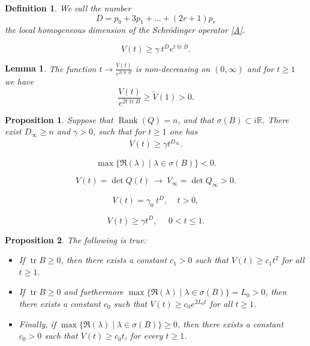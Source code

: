 \documentclass[10pt,a4paper]{amsart}
\newtheorem{definition}{Definition}
\newtheorem{lemma}{Lemma}
\newtheorem{proposition}{Proposition}
\newcommand{\tr}{\operatorname{tr}}
\begin{document}
\begin{definition}\label{D:hd}
We call the number  
\begin{equation}\label{hd}
D = p_0+3p_1+\ldots+(2r+1)p_r
\end{equation}
the \emph{local homogeneous dimension} of the Schr\"odinger operator \eqref{A}. 
\end{definition}

\begin{equation}\label{H0}
V(t) \ge \gamma\ t^{D} e^{t \tr B}.
\end{equation}

\begin{lemma}\label{L:ber}
The function $t\to \frac{V(t)}{e^{2 t \tr B}}$ is non-decreasing on $(0,\infty)$ and for $t\ge 1$ we have  
\begin{equation}\label{below}
\frac{V(t)}{e^{2 t \tr B}} \ge \tilde V(1)>0.
\end{equation}
\end{lemma}

\begin{proposition}\label{P:ii}
Suppose that $\operatorname{Rank}(Q) = n$, and that $\sigma(B)\subset i \mathbb{R}$. There exist $D_{\infty}\ge n$ and $\gamma>0$, such that for $t\ge 1$ one has
\begin{align*}
V(t)\ge \gamma t^{D_{\infty}}.
\end{align*}
\end{proposition}

\begin{equation}\label{quasi}
\max\{\Re(\lambda)\mid \lambda\in \sigma(B)\}< 0.
\end{equation}

\begin{equation}\label{quasinfty}
V(t) = \det Q(t) \ \longrightarrow\ V_\infty = \det Q_\infty > 0.
\end{equation}

\begin{equation}\label{voldil}
\overline V(t) = \gamma_0\ t^{D},\ \ \ \ \ t>0,
\end{equation}

\begin{equation}\label{vicinoa0}
V(t) \ge \gamma t^D,\ \ \ \ \ \ 0<t\le 1.
\end{equation}

\begin{proposition}\label{P:boom0}
The following is true:
\begin{itemize}
\item[(i)] If $\tr B \ge 0$, then there exists a constant $c_1>0$ such that $V(t) \geq c_1 t^2$ for all $t\geq 1$.
\item[(ii)] If $\tr B \ge 0$ and furthermore $\max\{\Re(\lambda)\mid \lambda\in \sigma(B)\}=L_0>0$, then there exists a constant $c_0$ such that $V(t)\geq c_0 e^{2 L_0 t}$ for all $t\geq 1$.
\item[(iii)] Finally, if $\max\{\Re(\lambda)\mid \lambda\in \sigma(B)\}\geq 0$, then there exists a constant $c_0>0$ such that $V(t)\geq c_0 t$, for every $t\ge 1$.
\end{itemize}
\end{proposition}
\end{document}

